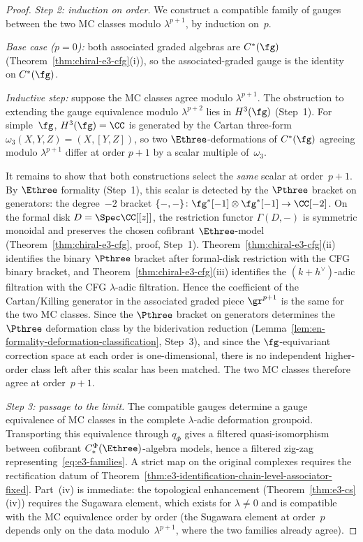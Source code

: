 \begin{proof}
\smallskip
\noindent\textit{Step 2: induction on order.}
We construct a compatible family of gauges between the two MC
classes modulo $\lambda^{p+1}$, by induction on~$p$.

\emph{Base case ($p = 0$):} both associated graded
algebras are $C^*(\fg)$
(Theorem~\ref{thm:chiral-e3-cfg}(i)), so
the associated-graded gauge is the identity on $C^*(\fg)$.

\emph{Inductive step:} suppose the MC classes agree modulo
$\lambda^{p+1}$. The obstruction to extending the gauge equivalence
modulo $\lambda^{p+2}$ lies in
$H^3(\fg)$ (Step~1). For simple~$\fg$,
$H^3(\fg) = \CC$ is generated by the Cartan three-form
$\omega_3(X, Y, Z) = (X, [Y, Z])$,
so two $\Ethree$-deformations of $C^*(\fg)$ agreeing
modulo $\lambda^{p+1}$ differ at order $p+1$ by a
scalar multiple of~$\omega_3$.

It remains to show that both constructions select the
\emph{same} scalar at order~$p+1$.
By $\Ethree$ formality (Step~1), this scalar is detected by
the $\Pthree$ bracket on generators:
the degree~$-2$ bracket
$\{-,-\}\colon \fg^*[-1] \otimes \fg^*[-1] \to \CC[-2]$.
On the formal disk $D = \Spec \CC[[z]]$, the restriction
functor $\Gamma(D, -)$ is symmetric monoidal and preserves the
chosen cofibrant $\Ethree$-model
(Theorem~\ref{thm:chiral-e3-cfg}, proof, Step~1).
Theorem~\ref{thm:chiral-e3-cfg}(ii) identifies the
binary $\Pthree$ bracket after formal-disk restriction with
the CFG binary bracket, and
Theorem~\ref{thm:chiral-e3-cfg}(iii) identifies the
$(k+h^\vee)$-adic filtration with the CFG
$\lambda$-adic filtration. Hence the coefficient of the
Cartan/Killing generator in the associated graded piece
$\gr^{p+1}$ is the same for the two MC classes.
Since the $\Pthree$ bracket on generators determines the
$\Pthree$ deformation class by the biderivation reduction
(Lemma~\ref{lem:en-formality-deformation-classification},
Step~3), and since the $\fg$-equivariant correction space
at each order is one-dimensional, there is no independent
higher-order class left after this scalar has been matched.
The two MC classes therefore agree at order~$p+1$.

\smallskip
\noindent\textit{Step 3: passage to the limit.}
The compatible gauges determine a gauge equivalence of MC classes in
the complete $\lambda$-adic deformation groupoid. Transporting this
equivalence through $q_\Phi$ gives a filtered quasi-isomorphism
between cofibrant $C_*^\Phi(\Ethree)$-algebra models, hence a
filtered zig-zag representing~\eqref{eq:e3-families}. A strict map on
the original complexes requires the rectification datum of
Theorem~\ref{thm:e3-identification-chain-level-associator-fixed}.
Part~(iv) is immediate: the topological enhancement
(Theorem~\ref{thm:e3-cs}(iv)) requires the Sugawara
element, which exists for $\lambda \neq 0$ and is
compatible with the MC equivalence order by order
(the Sugawara element at order~$p$ depends only on the
data modulo~$\lambda^{p+1}$, where the two families
already agree).


\end{proof}
